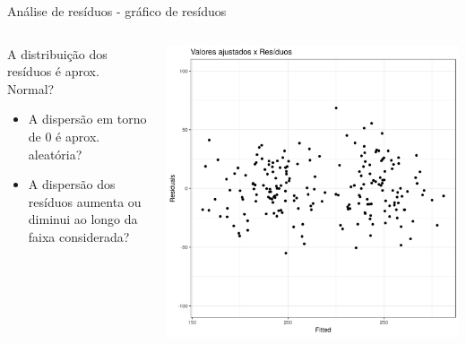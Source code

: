 \documentclass{beamer}
\begin{document}
\begin{frame}{\scriptsize Análise de resíduos - gráfico de resíduos}
  \begin{columns}
    \begin{column}{5cm}
      A distribuição dos resíduos é aprox. Normal?
      \bigskip
      \begin{itemize}
        \footnotesize
      \item A dispersão em torno de 0 é aprox. aleatória?
        \bigskip
      \item A dispersão dos resíduos aumenta ou diminui ao longo da faixa considerada?
      \end{itemize}
    \end{column}
    \begin{column}{5cm}
      \begin{center}
        \includegraphics[width=1.1\textwidth]{Cap18-19/pratica-rls-resid}
      \end{center}
    \end{column}
  \end{columns}
\end{frame}
\end{document}
